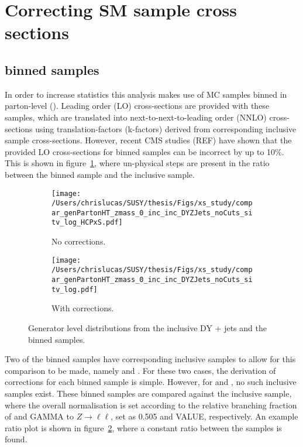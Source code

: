 \section{Correcting SM sample cross sections}
\label{sec:mc_xsec_corrs}

\subsection{\HTpart binned samples}
In order to increase statistics this analysis makes use of MC samples binned in 
parton-level \HT (\HTpart). Leading order (LO) cross-sections are provided with 
these samples, which are translated into next-to-next-to-leading order (NNLO) 
cross-sections using translation-factors (k-factors) derived from corresponding 
inclusive sample cross-sections. However, recent CMS studies (REF) have shown that the 
provided LO cross-sections for \HTpart binned samples can 
be incorrect by up to 10\%. This is shown in figure~\ref{fig:xsec_study_before},
where un-physical steps are present in the ratio between the \zj binned sample 
and the \dyj inclusive sample.

\begin{figure}[b!]
  \centering
  \begin{subfigure}[b]{0.45\textwidth}
    \texttt{[image: /Users/chrislucas/SUSY/thesis/Figs/xs\_study/compar\_genPartonHT\_zmass\_0\_inc\_inc\_DYZJets\_noCuts\_sitv\_log\_HCPxS.pdf]}
    \caption{No corrections.}
    \label{fig:xsec_study_before}
  \end{subfigure}             
  \begin{subfigure}[b]{0.45\textwidth}
    \texttt{[image: /Users/chrislucas/SUSY/thesis/Figs/xs\_study/compar\_genPartonHT\_zmass\_0\_inc\_inc\_DYZJets\_noCuts\_sitv\_log.pdf]}
    \caption{With corrections.}
    \label{fig:xsec_study_after}
  \end{subfigure}             
  \caption{Generator level \HTpart distributions from the
    inclusive DY + jets and the \HTpart binned \zj
    samples.}
  \label{fig:xsec_study}
\end{figure}

Two of the binned samples have corresponding inclusive samples to allow for 
this comparison to be made, namely \wj and \dyj. For these two cases, the 
derivation of corrections for each \HTpart binned sample is simple. However, for 
\zj and \gj, no such inclusive samples exist. These binned samples are 
compared against the inclusive \dyj sample, where the overall normalisation is 
set according to the relative branching fraction of \zinv and GAMMA to
$Z \to \ell\ell$, set as 0.505 and VALUE, respectively. An example ratio plot is
shown in figure~\ref{fig:xsec_study_after}, where a constant ratio between the 
samples is found.


